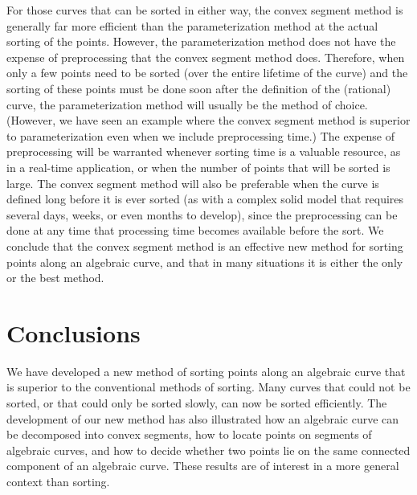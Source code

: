 For those curves that can be sorted in either way, the convex 
segment method 
is generally far more efficient than the parameterization method at 
the actual 
sorting of the points.
However, the parameterization method does not have the expense of 
preprocessing that the convex segment method does.
Therefore, when only a few points need to be sorted (over the 
entire lifetime 
of the curve) and the sorting of these points must be done soon after the 
definition of the (rational) curve, the parameterization method 
will usually 
be the method of choice.
(However, we have seen an example where the convex segment method 
is superior
to parameterization even when we include preprocessing time.)
The expense of preprocessing will be warranted whenever sorting time is a 
valuable resource, as in a real-time application, or when the number of 
points 
that will be sorted is large.
The convex segment method will also be preferable when the curve is defined 
long before it is ever sorted (as with a complex solid model that requires 
several days, weeks, or even months to develop), since the preprocessing 
can 
be done at any time that processing time becomes available before the sort.
We conclude that the convex segment method is an effective new method for
sorting points along an algebraic curve, and that in many situations it is 
either the only or the best method.

\section{Conclusions}
\label{sco}
We have developed a new method of sorting points along an algebraic curve
that is superior to the conventional methods of sorting.
Many curves that could not be sorted, or that could only be sorted slowly,
can now be sorted efficiently.
The development of our new method has also illustrated how an algebraic 
curve can 
be decomposed into convex segments, how to locate points on segments 
of algebraic curves, and how to decide whether two points lie on the same
connected component of an algebraic curve.
These results are of interest in a more general context than sorting.

